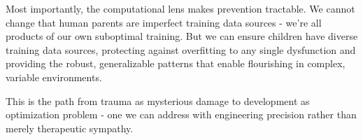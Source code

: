 \documentclass{article}
\begin{document}
Most importantly, the computational lens makes prevention tractable. We cannot change that human parents are imperfect training data sources - we're all products of our own suboptimal training. But we can ensure children have diverse training data sources, protecting against overfitting to any single dysfunction and providing the robust, generalizable patterns that enable flourishing in complex, variable environments.

This is the path from trauma as mysterious damage to development as optimization problem - one we can address with engineering precision rather than merely therapeutic sympathy.



\end{document}
